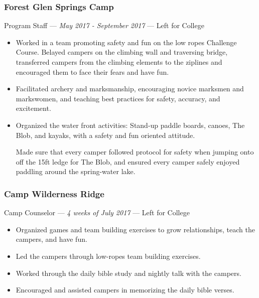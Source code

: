 \documentclass[letterpaper,10pt]{article}
\begin{document}
    \subsubsection{Forest Glen Springs Camp}
    \hfill Program Staff --- \emph{May 2017 - September 2017} --- Left for College

    \begin{itemize}
        \tightlist{}
        \item
        Worked in a team promoting safety and fun on the low ropes Challenge Course.
        Belayed campers on the climbing wall and traversing bridge, transferred campers from the climbing elements to the ziplines and encouraged them to face their fears and have fun.
        \item
        Facilitated archery and marksmanship, encouraging novice marksmen and markswomen, and teaching best practices for safety, accuracy, and excitement.
        \item
        Organized the water front activities: Stand-up paddle boards, canoes, The Blob, and kayaks, with a safety and fun oriented attitude.

        Made sure that every camper followed protocol for safety when jumping onto off the 15ft ledge for The Blob, and ensured every camper safely enjoyed paddling around the spring-water lake.
    \end{itemize}

    \subsubsection{Camp Wilderness Ridge}
    \hfill Camp Counselor --- \emph{4 weeks of July 2017} --- Left for College

    \begin{itemize}
        \tightlist{}
        \item
        Organized games and team building exercises to grow relationships, teach the campers, and have fun.
        \item
        Led the campers through low-ropes team building exercises.
        \item
        Worked through the daily bible study and nightly talk with the campers.
        \item
        Encouraged and assisted campers in memorizing the daily bible verses.
    \end{itemize}
\end{document}
